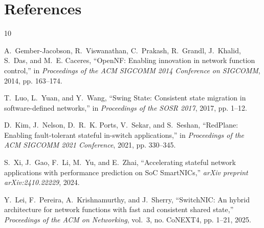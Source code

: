 \documentclass[10pt, conference, compsoc]{IEEEtran}
\begin{document}
\section*{References}
\begin{thebibliography}{10}

A.~Gember-Jacobson, R.~Viswanathan, C.~Prakash, R.~Grandl, J.~Khalid, S.~Das,
and M.~E. Caceres, ``OpenNF: Enabling innovation in network function control,''
in \emph{Proceedings of the ACM SIGCOMM 2014 Conference on SIGCOMM}, 2014,
pp. 163--174.

T.~Luo, L.~Yuan, and Y.~Wang, ``Swing State: Consistent state migration in
software-defined networks,'' in \emph{Proceedings of the SOSR 2017}, 2017,
pp. 1--12.

D.~Kim, J.~Nelson, D.~R.~K. Ports, V.~Sekar, and S.~Seshan, ``RedPlane:
Enabling fault-tolerant stateful in-switch applications,'' in
\emph{Proceedings of the ACM SIGCOMM 2021 Conference}, 2021, pp. 330--345.

S.~Xi, J.~Gao, F.~Li, M.~Yu, and E.~Zhai, ``Accelerating stateful network
applications with performance prediction on SoC SmartNICs,''
\emph{arXiv preprint arXiv:2410.22229}, 2024.

Y.~Lei, F.~Pereira, A.~Krishnamurthy, and J.~Sherry, ``SwitchNIC: An hybrid
architecture for network functions with fast and consistent shared state,''
\emph{Proceedings of the ACM on Networking}, vol.~3, no. CoNEXT4, pp. 1--21,
2025.

\end{thebibliography}
\end{document}
